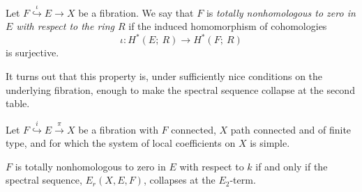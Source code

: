 \begin{definition}
    Let $F\overset{\iota}{\hookrightarrow }E\to X$ be a fibration. We say that $F$ is \textit{totally nonhomologous to zero in $E$ with respect to the ring $R$} if the induced homomorphism of cohomologies
    \begin{equation*}
        \iota: H^*(E;\ R) \to H^*(F;\ R)
    \end{equation*}
    is surjective. 
\end{definition}

It turns out that this property is, under sufficiently nice conditions on the underlying fibration, enough to make the spectral sequence collapse at the second table.
\begin{theorem}\label{fax} \cite{mccleary}
    Let $F\overset{i}{\hookrightarrow} E \overset{\pi}{\longrightarrow}X$ be a fibration with $F$ connected, $X$ path connected and of finite type, and for which the system of local coefficients on $X$ is simple.
    
    $F$ is totally nonhomologous to zero in $E$ with respect to $k$ if and only if the spectral sequence, $E_r(X,E,F)$, collapses at the $E_2$-term.
\end{theorem}
